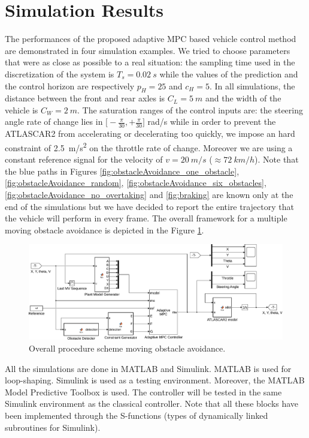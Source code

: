 \section{Simulation Results}
The performances of the proposed adaptive MPC based vehicle control method are demonstrated in four simulation examples. We tried to choose parameters that were as close as possible to a real situation: the sampling time used in the discretization of the system is $T_s=\SI{0.02}{s}$ while the values of the prediction and the control horizon are respectively $p_H=25$ and $c_H=5$. In all simulations, the distance between the front and rear axles is $C_L=\SI{5}{m}$ and the width of the vehicle is $C_W=\SI{2}{m}$. The saturation ranges of the control inputs are: the steering angle rate of change lies in $\big[-\frac{\pi}{30}, +\frac{\pi}{30}\big]$ rad/s while in order to prevent the ATLASCAR2 from accelerating or decelerating too quickly, we impose an hard constraint of \SI{2.5}{m/s^2} on the throttle rate of change. Moreover we are using a constant reference signal for the velocity of $v=\SI{20}{m/s}$ ($\approx\SI{72}{km/h}$).
Note that the blue paths in Figures \ref{fig:obstacleAvoidance_one_obstacle}, \ref{fig:obstacleAvoidance_random}, 	\ref{fig:obstacleAvoidance_six_obstacles}, \ref{fig:obstacleAvoidance_no_overtaking} and \ref{fig:braking} are known only at the end of the simulations but we have decided to report the entire trajectory that the vehicle will perform in every frame. The overall framework for a multiple moving obstacle avoidance is depicted in the Figure \ref{fig:MovingObstacleAvoidance}.
\begin{figure}[!h]
	\centering
	\includegraphics[width=\textwidth]{../figure/MovingObstacleAvoidance.pdf}
	\caption{Overall procedure scheme moving obstacle avoidance.}
	\label{fig:MovingObstacleAvoidance}
\end{figure}

All the simulations are done in MATLAB and Simulink. MATLAB is used for loop-shaping. Simulink is used as a testing environment.  Moreover, the MATLAB Model Predictive Toolbox is used. The controller will be tested in the same Simulink environment as the classical controller. Note that all these blocks have been implemented through the S-functions (types of dynamically linked subroutines for Simulink).

